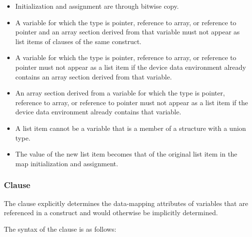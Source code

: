 \ccppspecificstart
\begin{itemize}
\item Initialization and assignment are through bitwise copy.

\item A variable for which the type is pointer, reference to array, or reference to pointer and 
an array section derived from that variable must not appear as list items of 
clauses of the same construct. 

\item A variable for which the type is pointer, reference to array, or reference to pointer must not appear as a list item if the device data environment already contains an array section derived from that variable.

\item An array section derived from a variable for which the type is pointer, reference to array, or reference to pointer must not appear as a list item if the device data environment already contains that variable. 

\item A list item cannot be a variable that is a member of a structure with a union type.

\end{itemize}
\ccppspecificend

\begin{samepage}
\fortranspecificstart
\begin{itemize}
\item The value of the new list item becomes that of the original list item in the map 
initialization and assignment.
\fortranspecificend
\end{itemize}
\end{samepage}





\subsubsection{ Clause}
\label{subsubsec:defaultmap clause}
\summary
The  clause explicitly determines the data-mapping attributes of variables that 
are referenced in a  construct and would otherwise be 
implicitly determined.

\syntax
\ccppspecificstart
The syntax of the  clause is as follows:

